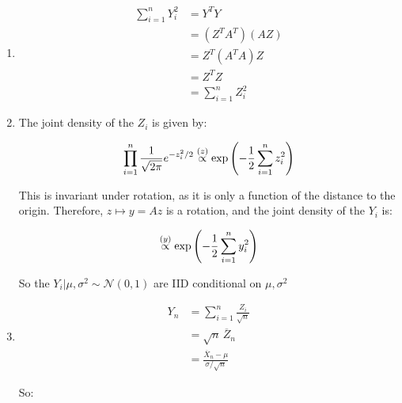 \documentclass[a4paper]{article}
\begin{document}
                    \begin{enumerate}
                        \item
                            \begin{align*}
                                \sum_{i=1}^n Y_i^2 & = Y^TY \\
                                & = (Z^TA^T)(AZ) \\
                                & = Z^T(A^TA)Z \\
                                & = Z^TZ \\
                                & = \sum_{i=1}^n Z_i^2
                            \end{align*}

                        \item The joint density of the $Z_i$ is given by:

                            \[
                                \prod_{i=1}^n \frac{1}{\sqrt{2\pi}} e^{-z_i^2/2}
                                \stackrel{({z})}{\propto} \exp\left(-\frac{1}{2} \sum_{i=1}^n
                                z_i^2\right)
                            \]

                            This is invariant under rotation, as it is only a
                            function of the distance to the origin. Therefore,
                            $z \mapsto y = Az$ is a rotation, and the joint
                            density of the $Y_i$ is:

                            \[
                                \stackrel{({y})}{\propto} \exp\left(-\frac{1}{2} \sum_{i=1}^n
                                y_i^2\right)
                            \]

                            So the $Y_i | \mu, \sigma^2 \sim \mathcal{N}(0, 1)$
                            are IID conditional on $\mu, \sigma^2$

                        \item
                            \begin{align*}
                                Y_n & = \sum_{i=1}^n \frac{Z_i}{\sqrt{n}} \\
                                & = \sqrt{n}\,\overline Z_n \\
                                & = \frac{\overline X_n - \mu}{\sigma/\sqrt{n}}
                            \end{align*}

                            So:


\end{enumerate}
\end{document}
